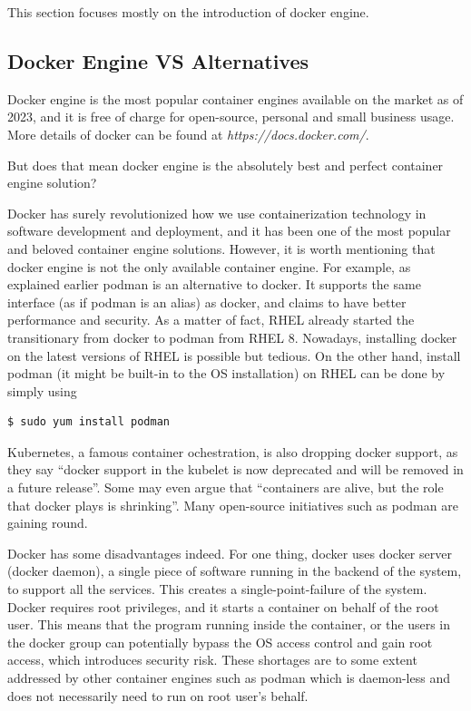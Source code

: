 This section focuses mostly on the introduction of docker engine.

\subsection{Docker Engine VS Alternatives}

Docker engine is the most popular container engines available on the market as of 2023, and it is free of charge for open-source, personal and small business usage. More details of docker can be found at \textit{https://docs.docker.com/}.

But does that mean docker engine is the absolutely best and perfect container engine solution?

Docker has surely revolutionized how we use containerization technology in software development and deployment, and it has been one of the most popular and beloved container engine solutions. However, it is worth mentioning that docker engine is not the only available container engine. For example, as explained earlier podman is an alternative to docker. It supports the same interface (as if podman is an alias) as docker, and claims to have better performance and security. As a matter of fact, RHEL already started the transitionary from docker to podman from RHEL 8. Nowadays, installing docker on the latest versions of RHEL is possible but tedious. On the other hand, install podman (it might be built-in to the OS installation) on RHEL can be done by simply using
\begin{lstlisting}
$ sudo yum install podman
\end{lstlisting}
Kubernetes, a famous container ochestration, is also dropping docker support, as they say ``docker support in the kubelet is now deprecated and will be removed in a future release''. Some may even argue that ``containers are alive, but the role that docker plays is shrinking''. Many open-source initiatives such as podman are gaining round.

Docker has some disadvantages indeed. For one thing, docker uses docker server (docker daemon), a single piece of software running in the backend of the system, to support all the services. This creates a single-point-failure of the system. Docker requires root privileges, and it starts a container on behalf of the root user. This means that the program running inside the container, or the users in the docker group can potentially bypass the OS access control and gain root access, which introduces security risk. These shortages are to some extent addressed by other container engines such as podman which is daemon-less and does not necessarily need to run on root user's behalf.

